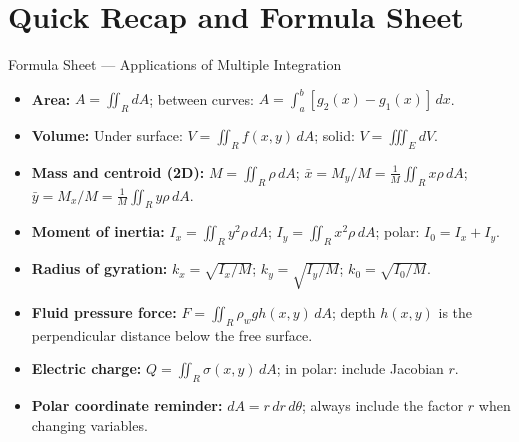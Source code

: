 \documentclass[12pt,a4paper]{article}
\begin{document}
\section{Quick Recap and Formula Sheet}

\begin{learnbox}{Formula Sheet --- Applications of Multiple Integration}
\begin{itemize}[leftmargin=1.5em]
  \item \textbf{Area:} \(A = \iint_R dA\); between curves: \(A = \int_a^b [g_2(x) - g_1(x)]\,dx\).
  \item \textbf{Volume:} Under surface: \(V = \iint_R f(x,y)\,dA\); solid: \(V = \iiint_E dV\).
  \item \textbf{Mass and centroid (2D):} \(M = \iint_R \rho\,dA\); \(\bar{x} = M_y/M = \tfrac{1}{M}\iint_R x\rho\,dA\); \(\bar{y} = M_x/M = \tfrac{1}{M}\iint_R y\rho\,dA\).
  \item \textbf{Moment of inertia:} \(I_x = \iint_R y^2\rho\,dA\); \(I_y = \iint_R x^2\rho\,dA\); polar: \(I_0 = I_x + I_y\).
  \item \textbf{Radius of gyration:} \(k_x = \sqrt{I_x/M}\); \(k_y = \sqrt{I_y/M}\); \(k_0 = \sqrt{I_0/M}\).
  \item \textbf{Fluid pressure force:} \(F = \iint_R \rho_w g h(x,y)\,dA\); depth \(h(x,y)\) is the perpendicular distance below the free surface.
  \item \textbf{Electric charge:} \(Q = \iint_R \sigma(x,y)\,dA\); in polar: include Jacobian \(r\).
  \item \textbf{Polar coordinate reminder:} \(dA = r\,dr\,d\theta\); always include the factor \(r\) when changing variables.
\end{itemize}
\end{learnbox}
\end{document}
